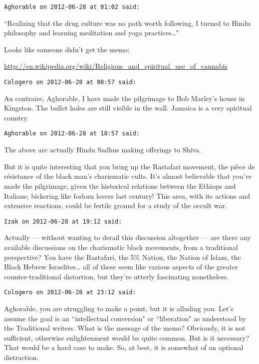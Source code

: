 \begin{footnotesize}\begin{sffamily}



\texttt{Aghorable on 2012-06-28 at 01:02 said: }

``Realizing that the drug culture was no path worth following, I turned to Hindu philosophy and learning meditation and yoga practices…"

Looks like someone didn't get the memo:



\url{http://en.wikipedia.org/wiki/Religious\_and\_spiritual\_use\_of\_cannabis}


\hfill

\texttt{Cologero on 2012-06-28 at 08:57 said: }

Au contraire, Aghorable, I have made the pilgrimage to Bob Marley's house in Kingston. The bullet holes are still visible in the wall. Jamaica is a very spiritual country.


\hfill

\texttt{Aghorable on 2012-06-28 at 18:57 said: }

The above are actually Hindu Sadhus making offerings to Shiva.

But it is quite interesting that you bring up the Rastafari movement, the pièce de résistance of the black man's charismatic cults. It's almost believable that you've made the pilgrimage, given the historical relations between the Ethiops and Italians; bickering like forlorn lovers last century! This area, with its actions and extensive reactions, could be fertile ground for a study of the occult war.


\hfill

\texttt{Izak on 2012-06-28 at 19:12 said: }

Actually — without wanting to derail this discussion altogether — are there any available discussions on the charismatic black movements, from a traditional perspective? You have the Rastafari, the 5\% Nation, the Nation of Islam, the Black Hebrew Israelites… all of these seem like various aspects of the greater counter-traditional distortion, but they're utterly fascinating nonetheless.


\hfill

\texttt{Cologero on 2012-06-28 at 23:12 said: }

Aghorable, you are struggling to make a point, but it is alluding you. Let's assume the goal is an ``intellectual conversion" or ``liberation" as understood by the Traditional writers. What is the message of the memo? Obviously, it is not sufficient, otherwise enlightenment would be quite common. But is it necessary? That would be a hard case to make. So, at best, it is somewhat of an optional distraction.


\end{sffamily}
\end{footnotesize}
